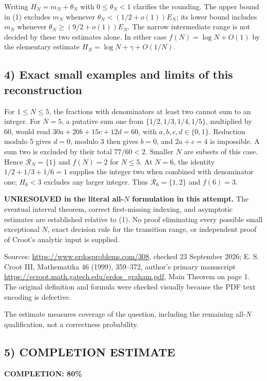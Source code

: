 Writing $H_N=m_N+\theta_N$ with $0\le\theta_N<1$ clarifies the rounding. The upper bound in (1) excludes $m_N$ whenever $\theta_N<(1/2+o(1))E_N$; its lower bound includes $m_N$ whenever $\theta_N\ge(9/2+o(1))E_N$. The narrow intermediate range is not decided by these two estimates alone. In either case $f(N)=\log N+O(1)$ by the elementary estimate $H_N=\log N+\gamma+O(1/N)$.

\subsection*{4) Exact small examples and limits of this reconstruction}
For $1\le N\le5$, the fractions with denominators at least two cannot sum to an integer. For $N=5$, a putative sum one from $\{1/2,1/3,1/4,1/5\}$, multiplied by 60, would read $30a+20b+15c+12d=60$, with $a,b,c,d\in\{0,1\}$. Reduction modulo 5 gives $d=0$, modulo 3 then gives $b=0$, and $2a+c=4$ is impossible. A sum two is excluded by their total $77/60<2$. Smaller $N$ are subsets of this case. Hence $\mathcal R_N=\{1\}$ and $f(N)=2$ for $N\le5$. At $N=6$, the identity $1/2+1/3+1/6=1$ supplies the integer two when combined with denominator one; $H_6<3$ excludes any larger integer. Thus $\mathcal R_6=\{1,2\}$ and $f(6)=3$.

\textbf{UNRESOLVED in the literal all-$N$ formulation in this attempt.} The eventual interval theorem, correct first-missing indexing, and asymptotic estimates are established relative to (1). No proof eliminating every possible small exceptional $N$, exact decision rule for the transition range, or independent proof of Croot's analytic input is supplied.

Sources: \url{https://www.erdosproblems.com/308}, checked 23 September 2026; E. S. Croot III, Mathematika 46 (1999), 359--372, author's primary manuscript \url{https://ecroot.math.gatech.edu/erdos_graham.pdf}, Main Theorem on page 1. The original definition and formula were checked visually because the PDF text encoding is defective.

The estimate measures coverage of the question, including the remaining all-$N$ qualification, not a correctness probability.
\subsection*{5) COMPLETION ESTIMATE}
\textbf{COMPLETION: 80\%}
